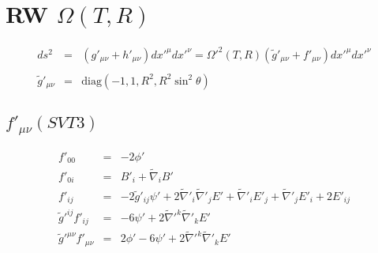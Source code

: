 \documentclass[10pt,letterpaper]{article}
\numberwithin{equation}{section}
\begin{document}
\section{RW $\Omega(T,R)$}
\begin{eqnarray}
ds^2 &=& (g'_{\mu\nu} + h'_{\mu\nu})dx'^\mu dx'^\nu = \Omega'^2(T,R)(\tilde g'_{\mu\nu} + f'_{\mu\nu})dx'^\mu dx'^\nu
\\ \nonumber\\
\tilde g'_{\mu\nu} &=& \text{diag}\left(-1,1,R^2,R^2\sin^2\theta\right)
\end{eqnarray}
%
\subsection{$f'_{\mu\nu}(SVT3)$}
\begin{eqnarray}
f'_{00} &=& -2\phi'
\nonumber\\
f'_{0i} &=& B'_i + \tilde\nabla_i B'
\nonumber\\
f'_{ij} &=& -2\tilde g'_{ij} \psi' + 2\tilde\nabla'_i\tilde\nabla'_j E' + \tilde\nabla'_i E'_j + \tilde\nabla'_j E'_i + 2E'_{ij}
\nonumber\\
\tilde g'^{ij} f'_{ij} &=& -6\psi' + 2\tilde\nabla'^k\tilde\nabla'_k E'
\nonumber\\
\tilde g'^{\mu\nu} f'_{\mu\nu} &=& 2\phi'-6\psi' + 2\tilde\nabla'^k\tilde\nabla'_k E'
\end{eqnarray}
%
\end{document}
